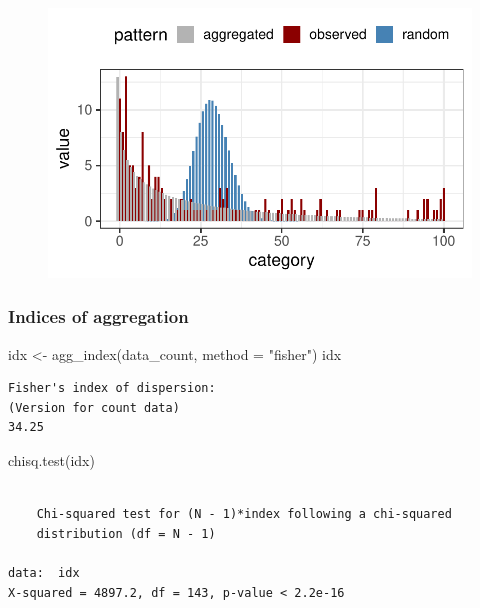 \documentclass[
  letterpaper,
  DIV=11,
  numbers=noendperiod]{scrreprt}
\newenvironment{Shaded}{\begin{snugshade}}{\end{snugshade}}
\newcommand{\AttributeTok}[1]{\textcolor[rgb]{0.40,0.45,0.13}{#1}}
\newcommand{\FunctionTok}[1]{\textcolor[rgb]{0.28,0.35,0.67}{#1}}
\newcommand{\NormalTok}[1]{\textcolor[rgb]{0.00,0.23,0.31}{#1}}
\newcommand{\OtherTok}[1]{\textcolor[rgb]{0.00,0.23,0.31}{#1}}
\newcommand{\StringTok}[1]{\textcolor[rgb]{0.13,0.47,0.30}{#1}}
\begin{document}
\begin{figure}[H]

{\centering \includegraphics{./spatial-tests_files/figure-pdf/unnamed-chunk-94-1.pdf}

}

\end{figure}

\hypertarget{indices-of-aggregation}{%
\subsubsection{Indices of aggregation}\label{indices-of-aggregation}}

\begin{Shaded}
\begin{Highlighting}[]
\NormalTok{idx }\OtherTok{\textless{}{-}} \FunctionTok{agg\_index}\NormalTok{(data\_count, }\AttributeTok{method =} \StringTok{"fisher"}\NormalTok{)}
\NormalTok{idx}
\end{Highlighting}
\end{Shaded}

\begin{verbatim}
Fisher's index of dispersion:
(Version for count data)
34.25
\end{verbatim}

\begin{Shaded}
\begin{Highlighting}[]
\FunctionTok{chisq.test}\NormalTok{(idx)}
\end{Highlighting}
\end{Shaded}

\begin{verbatim}

    Chi-squared test for (N - 1)*index following a chi-squared
    distribution (df = N - 1)

data:  idx
X-squared = 4897.2, df = 143, p-value < 2.2e-16
\end{verbatim}
\end{document}
